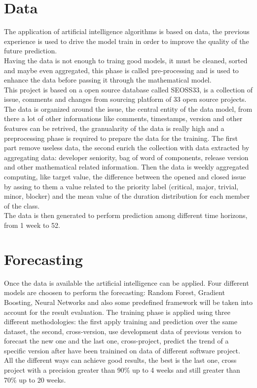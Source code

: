 \documentclass{article}
\begin{document}
\section{Data}
The application of artificial intelligence algorithms is based on data, the previous experience is used to drive the model train in order to improve the quality of the future prediction.\\
Having the data is not enough to traing good models, it must be cleaned, sorted and maybe even aggregated, this phase is called pre-processing and is used to enhance the data before passing it through the mathematical model.\\
This project is based on a open source database called SEOSS33, is a collection of issue, comments and changes from sourcing platform of 33 open source projects. The data is organized around the issue, the central entity of the data model, from there a lot of other informations like comments, timestamps, version and other features can be retrived, the granualarity of the data is really high and a preprocessing phase is required to prepare the data for the training. The first part remove useless data, the second enrich the collection with data extracted by aggregating data: developer seniority, bag of word of components, release version and other mathematical related information. Then the data is weekly aggregated computing, like target value, the difference between the opened and closed issue by assing to them a value related to the priority label (critical, major, trivial, minor, blocker) and the mean value of the duration distribution for each member of the class.\\
The data is then generated to perform prediction among different time horizons, from 1 week to 52.

\section{Forecasting}
Once the data is available the artificial intelligence can be applied. Four different models are choosen to perform the forecasting: Random Forest, Gradient Boosting, Neural Networks and also some predefined framework will be taken into account for the result evaluation. The training phase is applied using three different methodologies: the first apply training and prediction over the same dataset, the second, cross-version, use development data of previous version to forecast the new one and the last one, cross-project, predict the trend of a specific version after have been trainined on data of different software project.\\
All the different ways can achieve good results, the best is the last one, cross project with a precision greater than 90\% up to 4 weeks and still greater than 70\% up to 20 weeks. 
\end{document}
